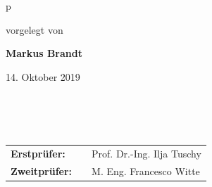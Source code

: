 \begin{center}
\begin{tabular}{p{\textwidth}}
\begin{center}
vorgelegt von
\end{center}

\begin{center}
\large{\textbf{Markus Brandt}} \\
\end{center}

\begin{center}
\large{14. Oktober 2019}
\end{center}

\\
\\
\\

\begin{center}
\begin{tabular}{lll}
\textbf{Erstprüfer:} & & Prof. Dr.-Ing. Ilja Tuschy\\
\textbf{Zweitprüfer:} & &M. Eng. Francesco Witte\\
\end{tabular}
\end{center}

\end{tabular}
\end{center}